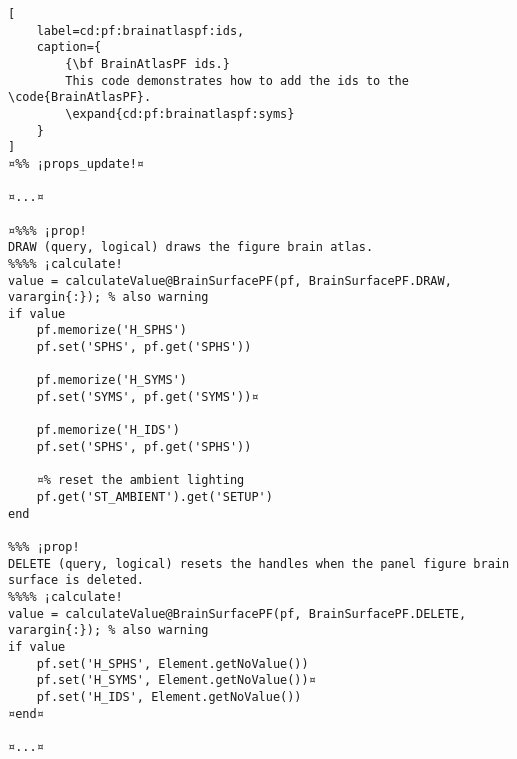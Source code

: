 \documentclass{tufte-handout}
\begin{document}
\begin{lstlisting}[
	label=cd:pf:brainatlaspf:ids,
	caption={
		{\bf BrainAtlasPF ids.}
		This code demonstrates how to add the ids to the \code{BrainAtlasPF}.
		\expand{cd:pf:brainatlaspf:syms}
	}
]
¤%% ¡props_update!¤

¤...¤

¤%%% ¡prop!
DRAW (query, logical) draws the figure brain atlas.
%%%% ¡calculate!
value = calculateValue@BrainSurfacePF(pf, BrainSurfacePF.DRAW, varargin{:}); % also warning
if value
    pf.memorize('H_SPHS')
    pf.set('SPHS', pf.get('SPHS'))

    pf.memorize('H_SYMS')
    pf.set('SYMS', pf.get('SYMS'))¤

    pf.memorize('H_IDS')
    pf.set('SPHS', pf.get('SPHS'))

    ¤% reset the ambient lighting
    pf.get('ST_AMBIENT').get('SETUP')
end

%%% ¡prop!
DELETE (query, logical) resets the handles when the panel figure brain surface is deleted.
%%%% ¡calculate!
value = calculateValue@BrainSurfacePF(pf, BrainSurfacePF.DELETE, varargin{:}); % also warning
if value
    pf.set('H_SPHS', Element.getNoValue())
    pf.set('H_SYMS', Element.getNoValue())¤
    pf.set('H_IDS', Element.getNoValue())
¤end¤

¤...¤
\end{lstlisting}
\end{document}
